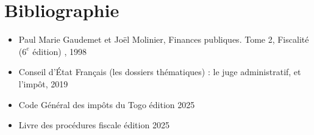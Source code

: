 \documentclass[Cours_contentieuxTF2026.tex]{subfiles}
\begin{document}
\chapter*{Bibliographie}
\begin{itemize}[font=\color{magenta} \Large, label=]
	\item Paul Marie Gaudemet et Joël Molinier, Finances publiques. Tome 2, Fiscalité ($6^{e}$ édition) , 1998
	\item Conseil d’État Français (les dossiers thématiques) :  le juge administratif, et l'impôt,  2019
	\item  Code Général des impôts du Togo édition 2025
	\item Livre des procédures fiscale édition 2025
\end{itemize}
\end{document}
